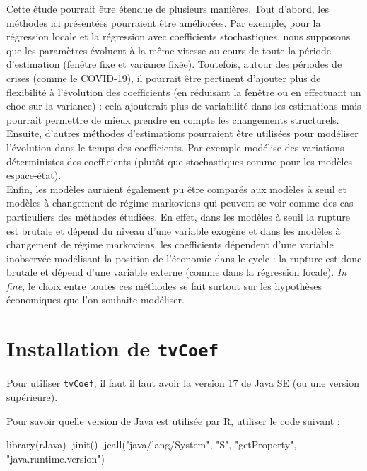 \documentclass[
  a4paper,
  DIV=11,
  numbers=noendperiod,
  french]{scrartcl}
\newenvironment{Shaded}{\begin{snugshade}}{\end{snugshade}}
\newcommand{\FunctionTok}[1]{\textcolor[rgb]{0.28,0.35,0.67}{#1}}
\newcommand{\NormalTok}[1]{\textcolor[rgb]{0.00,0.23,0.31}{#1}}
\newcommand{\StringTok}[1]{\textcolor[rgb]{0.13,0.47,0.30}{#1}}
\newcommand\1{{\mathds 1}}
\theoremstyle{remark}
\begin{document}
Cette étude pourrait être étendue de plusieurs manières. Tout d'abord,
les méthodes ici présentées pourraient être améliorées. Par exemple,
pour la régression locale et la régression avec coefficients
stochastiques, nous supposons que les paramètres évoluent à la même
vitesse au cours de toute la période d'estimation (fenêtre fixe et
variance fixée). Toutefois, autour des périodes de crises (comme le
COVID-19), il pourrait être pertinent d'ajouter plus de flexibilité à
l'évolution des coefficients (en réduisant la fenêtre ou en effectuant
un choc sur la variance) : cela ajouterait plus de variabilité dans les
estimations mais pourrait permettre de mieux prendre en compte les
changements structurels.\\
Ensuite, d'autres méthodes d'estimations pourraient être utilisées pour
modéliser l'évolution dans le temps des coefficients. Par exemple
\textcite{melard} modélise des variations déterministes des coefficients
(plutôt que stochastiques comme pour les modèles espace-état).\\
Enfin, les modèles auraient également pu être comparés aux modèles à
seuil et modèles à changement de régime markoviens \autocite[pour une
revue bibliographique de ces modèles, voir par
exemple][]{PETROPOULOS2022705} qui peuvent se voir comme des cas
particuliers des méthodes étudiées. En effet, dans les modèles à seuil
la rupture est brutale et dépend du niveau d'une variable exogène et
dans les modèles à changement de régime markoviens, les coefficients
dépendent d'une variable inobservée modélisant la position de l'économie
dans le cycle : la rupture est donc brutale et dépend d'une variable
externe (comme dans la régression locale). \emph{In fine}, le choix
entre toutes ces méthodes se fait surtout sur les hypothèses économiques
que l'on souhaite modéliser.

\newpage
\appendix

\section{\texorpdfstring{Installation de
\texttt{tvCoef}}{Installation de tvCoef}}\label{installation-de-tvcoef}

Pour utiliser \texttt{tvCoef}, il faut il faut avoir la version 17 de
Java SE (ou une version supérieure).

Pour savoir quelle version de Java est utilisée par R, utiliser le code
suivant :

\begin{Shaded}
\begin{Highlighting}[]
\FunctionTok{library}\NormalTok{(rJava)}
\FunctionTok{.jinit}\NormalTok{()}
\FunctionTok{.jcall}\NormalTok{(}\StringTok{"java/lang/System"}\NormalTok{, }\StringTok{"S"}\NormalTok{, }\StringTok{"getProperty"}\NormalTok{, }\StringTok{"java.runtime.version"}\NormalTok{)}
\end{Highlighting}
\end{Shaded}
\end{document}
